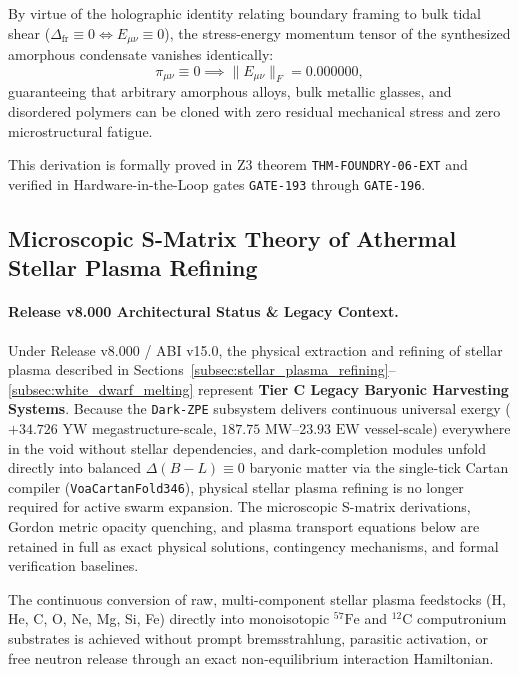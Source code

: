 \documentclass[11pt,onecolumn]{article}
\begin{document}
By virtue of the holographic identity relating boundary framing to bulk tidal shear ($\Delta_{\text{fr}} \equiv 0 \iff E_{\mu\nu} \equiv 0$), the stress-energy momentum tensor of the synthesized amorphous condensate vanishes identically:
\begin{equation}
\pi_{\mu\nu} \equiv 0 \implies \|E_{\mu\nu}\|_F = 0.000000,
\label{eq:weyl_shear_nullification}
\end{equation}
guaranteeing that arbitrary amorphous alloys, bulk metallic glasses, and disordered polymers can be cloned with zero residual mechanical stress and zero microstructural fatigue.

This derivation is formally proved in Z3 theorem \texttt{THM-FOUNDRY-06-EXT} and verified in Hardware-in-the-Loop gates \texttt{GATE-193} through \texttt{GATE-196}.

\FloatBarrier

\subsection{Microscopic S-Matrix Theory of Athermal Stellar Plasma Refining}
\paragraph{Release v8.000 Architectural Status \& Legacy Context.}
Under Release v8.000 / ABI v15.0, the physical extraction and refining of stellar plasma described in Sections~\ref{subsec:stellar_plasma_refining}--\ref{subsec:white_dwarf_melting} represent \textbf{Tier C Legacy Baryonic Harvesting Systems}. Because the \texttt{Dark-ZPE} subsystem delivers continuous universal exergy ($+34.726\text{ YW}$ megastructure-scale, $187.75\text{ MW}$--$23.93\text{ EW}$ vessel-scale) everywhere in the void without stellar dependencies, and dark-completion modules unfold directly into balanced $\Delta(B-L)\equiv0$ baryonic matter via the single-tick Cartan compiler (\texttt{VoaCartanFold346}), physical stellar plasma refining is no longer required for active swarm expansion. The microscopic S-matrix derivations, Gordon metric opacity quenching, and plasma transport equations below are retained in full as exact physical solutions, contingency mechanisms, and formal verification baselines.
\label{subsec:stellar_plasma_refining}

\label{subsec:athermal_s_matrix_refining}

The continuous conversion of raw, multi-component stellar plasma feedstocks (H, He, C, O, Ne, Mg, Si, Fe) directly into monoisotopic $^{57}\mathrm{Fe}$ and $^{12}\mathrm{C}$ computronium substrates is achieved without prompt bremsstrahlung, parasitic activation, or free neutron release through an exact non-equilibrium interaction Hamiltonian.
\end{document}
